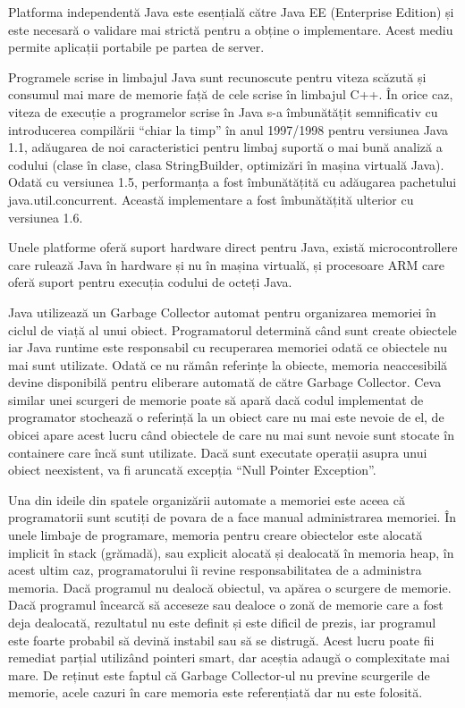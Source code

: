 \documentclass[12pt]{book}
\begin{document}
Platforma independentă Java este esențială către Java EE (Enterprise Edition) și este necesară o validare mai strictă  pentru a obține o implementare. Acest mediu permite aplicații portabile pe partea de server.

Programele scrise in limbajul Java sunt recunoscute pentru viteza scăzută și consumul mai mare de memorie față de cele scrise în limbajul C++. În orice caz, viteza de execuție a programelor scrise în Java s-a îmbunătățit semnificativ cu introducerea compilării “chiar la timp” în anul 1997/1998 pentru versiunea Java 1.1, adăugarea de noi caracteristici pentru limbaj suportă o mai bună analiză a codului (clase în clase, clasa StringBuilder, optimizări în mașina virtuală Java). Odată cu versiunea 1.5, performanța a fost îmbunătățită cu adăugarea pachetului java.util.concurrent. Această implementare a fost îmbunătățită ulterior cu versiunea 1.6.

Unele platforme oferă suport hardware direct pentru Java, există microcontrollere care rulează Java în hardware și nu în mașina virtuală, și procesoare ARM care oferă suport pentru execuția codului de octeți Java.

Java utilizează un Garbage Collector automat pentru organizarea memoriei în ciclul de viață al unui obiect. Programatorul determină când sunt create obiectele iar Java runtime este responsabil cu recuperarea memoriei odată ce obiectele nu mai sunt utilizate. Odată ce nu rămân referințe la obiecte, memoria neaccesibilă devine disponibilă pentru eliberare automată de către Garbage Collector. Ceva similar unei scurgeri de memorie poate să apară dacă codul implementat de programator stochează o referință la un obiect care nu mai este nevoie de el, de obicei apare acest lucru când obiectele de care nu mai sunt nevoie sunt stocate în containere care încă sunt utilizate. Dacă sunt executate operații asupra unui obiect neexistent, va fi aruncată excepția “Null Pointer Exception”. 

Una din ideile din spatele organizării automate a memoriei este aceea că programatorii sunt scutiți de povara de a face manual administrarea memoriei. În unele limbaje de programare, memoria pentru creare obiectelor este alocată implicit în stack (grămadă), sau explicit alocată și dealocată în memoria heap, în acest ultim caz, programatorului îi revine responsabilitatea de a administra memoria. Dacă programul nu dealocă obiectul, va apărea o scurgere de memorie. Dacă programul încearcă să acceseze sau dealoce o zonă de memorie care a fost deja dealocată, rezultatul nu este definit și este dificil de prezis, iar programul este foarte probabil să devină instabil sau să se distrugă. Acest lucru poate fii remediat parțial utilizând pointeri smart, dar aceștia adaugă o complexitate mai mare. De reținut este faptul că Garbage Collector-ul nu previne scurgerile de memorie, acele cazuri în care memoria este referențiată dar nu este folosită.
\end{document}

